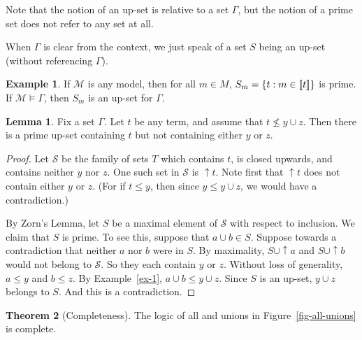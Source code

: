 \documentclass[12pt]{article}
\theoremstyle{definition}
\newtheorem{theorem}{Theorem}
\newtheorem{lemma}[theorem]{Lemma}
\newtheorem{example}{Example}
\newcommand{\semantics}[1]{[\![\mbox{\em $ #1 $\/}]\!]}
\newcommand{\Model}{\mathcal{M}}
\renewcommand{\SS}{\mathcal{S}}
\newcommand{\set}[1]{\{ #1 \}}
\begin{document}
Note that the notion of an up-set is relative to a set $\Gamma$, but the notion of a prime set does not refer to any set at all.

When $\Gamma$ is clear from the context, we just speak of a set $S$ being an up-set (without referencing $\Gamma$).

\begin{example}
If $\Model$ is any model, then for all $m\in M$, $S_m = \set{t : m \in \semantics{t}}$
is   prime.  If $\Model\models\Gamma$, then $S_m$ is an up-set for $\Gamma$.
\label{ex-3}
\end{example}

\begin{lemma}  Fix a set $\Gamma$.
Let $t$ be any term, and assume that $t \not\leq y\cup z$.
Then there is a prime up-set containing $t$ but not containing either $y$ or $z$.
\label{lemma-zorn}
\end{lemma}

\begin{proof}

Let $\SS$ be the family of sets $T$ which contains $t$, is closed upwards, and contains neither  $y$ nor $z$.
One such set in $\SS$ is $\uparrow t$.  Note first that $\uparrow t$ does not contain either $y$ or $z$.  (For if $t\leq y$, then since $y\leq y \cup z$, we would have a contradiction.)

By Zorn's Lemma, let $S$ be a maximal element of $\SS$ with respect to inclusion.
We claim that 
$S$ is  prime.   To see this, suppose that $a \cup b\in S$.  Suppose towards a contradiction that neither $a$ nor $b$ were in $S$.
By maximality, $S\cup\uparrow a$ and $S\cup\uparrow b$  would not belong to $\SS$. 
So they each contain $y$ or $z$.   Without loss of generality, $a\leq y$ and $b\leq z$.  
By Example~\ref{ex-1},  $a\cup b \leq y\cup z$.   Since $S$ is an up-set, $y\cup z$ belongs to $S$.    And this is a contradiction.
\end{proof}

\begin{theorem}[Completeness]
The logic of {\sf all} and unions in Figure~\ref{fig-all-unions} is complete.
\label{theorem-first-completeness-union}
\end{theorem}
\end{document}
